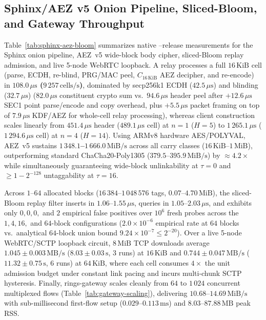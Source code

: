 \documentclass[journal]{IEEEtran}
\DeclareRobustCommand{\code}[1]{{\ttfamily\renewcommand{\_}{\textunderscore\allowbreak}#1}}
\begin{document}
\subsection{Sphinx/AEZ v5 Onion Pipeline, Sliced-Bloom, and Gateway Throughput}

Table~\ref{tab:sphinx-aez-bloom} summarizes native \code{--release} measurements for the Sphinx onion pipeline, AEZ~v5 wide-block body cipher, sliced-Bloom replay admission, and live 5-node WebRTC loopback. A relay processes a full $16\,\text{KiB}$ cell (parse, ECDH, re-blind, PRG/MAC peel, $C_{16\,\text{KiB}}$ AEZ decipher, and re-encode) in \textbf{$108.0\,\mu\text{s}$ ($9\,257\,\text{cells/s}$)}, dominated by secp256k1 ECDH ($42.5\,\mu\text{s}$) and blinding ($32.7\,\mu\text{s}$) ($82.0\,\mu\text{s}$ constituent crypto sum vs.\ $94.6\,\mu\text{s}$ header peel after $+12.6\,\mu\text{s}$ SEC1 point parse/encode and copy overhead, plus $+5.5\,\mu\text{s}$ packet framing on top of $7.9\,\mu\text{s}$ KDF/AEZ for whole-cell relay processing), whereas client construction scales linearly from $451.4\,\mu\text{s}$ header ($489.1\,\mu\text{s}$ cell) at $n=1$ ($H=5$) to $1\,265.1\,\mu\text{s}$ ($1\,294.6\,\mu\text{s}$ cell) at $n=4$ ($H=14$). Using ARMv8 hardware AES/POLYVAL, AEZ~v5 sustains \textbf{$1\,348.1$--$1\,666.0\,\text{MiB/s}$} across all carry classes ($16\,\text{KiB}$--$1\,\text{MiB}$), outperforming standard \code{ChaCha20-Poly1305} ($379.5$--$395.9\,\text{MiB/s}$) by $\approx\mathbf{4.2\times}$ while simultaneously guaranteeing wide-block unlinkability at $\tau=0$ and $\ge 1-2^{-128}$ untaggability at $\tau=16$.

Across $1$--$64$ allocated blocks ($16\,384$--$1\,048\,576$ tags, $0.07$--$4.70\,\text{MiB}$), the sliced-Bloom replay filter inserts in $1.06$--$1.55\,\mu\text{s}$, queries in $1.05$--$2.03\,\mu\text{s}$, and exhibits only $0,0,0,$ and $2$ empirical false positives over $10^6$ fresh probes across the $1,4,16,$ and $64$-block configurations ($2.0\times 10^{-6}$ empirical rate at $64$ blocks vs.\ analytical $64$-block union bound $9.24\times 10^{-7}\le 2^{-20}$). Over a live 5-node WebRTC/SCTP loopback circuit, $8\,\text{MiB}$ TCP downloads average \textbf{$1.045\pm 0.003\,\text{MB/s}$} ($8.03\pm 0.03\,\text{s}$, $3$ runs) at $16\,\text{KiB}$ and \textbf{$0.744\pm 0.047\,\text{MB/s}$} ($11.32\pm 0.75\,\text{s}$, $6$ runs) at $64\,\text{KiB}$, where each cell consumes $4\times$ the unit admission budget under constant link pacing and incurs multi-chunk SCTP hysteresis. Finally, \code{rings-gateway} scales cleanly from $64$ to $1\,024$ concurrent multiplexed flows (Table~\ref{tab:gateway-scaling}), delivering $10.68$--$14.69\,\text{MiB/s}$ with sub-millisecond first-flow setup ($0.029$--$0.113\,\text{ms}$) and $8.03$--$87.88\,\text{MB}$ peak RSS.
\end{document}
